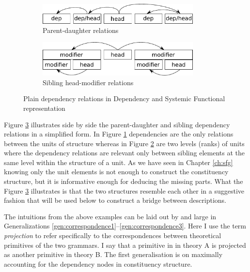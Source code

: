 \begin{figure}[hbtp]
    \centering
    \begin{subfigure}{.5\textwidth}
        \centering
        \includegraphics[width=0.9\textwidth]{Figures/SFL-grammar/dependency-dg.pdf}
        \vspace{+22pt}
        \caption{Parent-daughter relations}
        \label{fig:dependecy-dg}
    \end{subfigure}%
    \begin{subfigure}{.5\textwidth}
        \centering
        \includegraphics[width=0.9\textwidth]{Figures/SFL-grammar/dependency-sfg.pdf}
        \caption{Sibling head-modifier relations}
        \label{fig:dependecy-sfg}
    \end{subfigure}
    \caption{Plain dependency relations in Dependency and Systemic Functional representation}
    \label{fig:dependency-relations}
\end{figure}

Figure \ref{fig:dependency-relations} illustrates side by side the parent-daughter and sibling dependency relations in a simplified form. In Figure \ref{fig:dependecy-dg} dependencies are the only relations between the units of structure whereas in Figure \ref{fig:dependecy-sfg} are two levels (ranks) of units where the dependency relations are relevant only between sibling elements at the same level within the structure of a unit. As we have seen in Chapter \ref{ch:sfg} knowing only the unit elements is not enough to construct the constituency structure, but it is informative enough for deducing the missing parts. What the Figure \ref{fig:dependency-relations} illustrates is that the two structures resemble each other in a suggestive fashion that will be used below to construct a bridge between descriptions.  


The intuitions from the above examples can be laid out by and large in Generalizations \ref{gen:correspondence1}--\ref{gen:correspondence3}. Here I use the term \textit{projection} to refer specifically to the correspondences between theoretical primitives of the two grammars. I say that a primitive in in theory A is projected as another primitive in theory B. The first generalisation is on maximally accounting for the dependency nodes in constituency structure.

